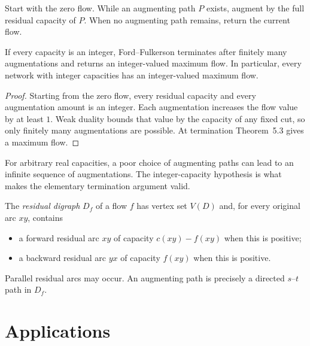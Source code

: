 \begin{notealgorithm}
Start with the zero flow.  While an augmenting path $P$ exists, augment by the
full residual capacity of $P$.  When no augmenting path remains, return the
current flow.
\end{notealgorithm}

\begin{notetheorem}
If every capacity is an integer, Ford--Fulkerson terminates after finitely many
augmentations and returns an integer-valued maximum flow.  In particular,
every network with integer capacities has an integer-valued maximum flow.
\end{notetheorem}
\begin{proof}
Starting from the zero flow, every residual capacity and every augmentation
amount is an integer.  Each augmentation increases the flow value by at least
$1$.  Weak duality bounds that value by the capacity of any fixed cut, so only
finitely many augmentations are possible.  At termination Theorem~5.3 gives a
maximum flow.
\end{proof}

\begin{noteremark}
For arbitrary real capacities, a poor choice of augmenting paths can lead to an
infinite sequence of augmentations.  The integer-capacity hypothesis is what
makes the elementary termination argument valid.
\end{noteremark}

\begin{notedefinition}
The \emph{residual digraph} $D_f$ of a flow $f$ has vertex set $V(D)$ and,
for every original arc $xy$, contains
\begin{itemize}
  \item a forward residual arc $xy$ of capacity $c(xy)-f(xy)$ when this is
        positive;
  \item a backward residual arc $yx$ of capacity $f(xy)$ when this is
        positive.
\end{itemize}
Parallel residual arcs may occur.  An augmenting path is precisely a directed
$s$--$t$ path in $D_f$.
\end{notedefinition}
\section{Applications}

